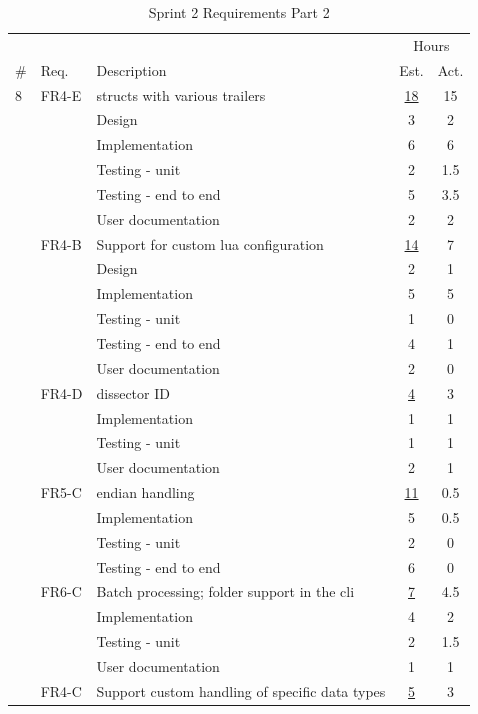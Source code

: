 \begin{table}[!htb] \small \center
\caption{Sprint 2 Requirements Part 2\label{tab:sprint2req2}}
\begin{tabularx}{\textwidth}{l l X c c}
	\toprule
	& & & \multicolumn{2}{c}{Hours} \\
	\cmidrule(r){4-5}
	\# & Req. & Description & Est. & Act. \\
	\midrule
	8 & FR4-E & \Glspl{struct} with various \gls{trailers} & \underline{ 18 } & 15 \\
	   &  & Design & 3 & 2 \\
	   &  & Implementation & 6 & 6 \\
	   &  & Testing - unit & 2 & 1.5 \\
	   &  & Testing - end to end & 5 & 3.5 \\
	   &  & User documentation & 2 & 2 \\
	\addlinespace
	9 & FR4-B & Support for custom \Gls{lua} configuration & \underline{ 14 } & 7 \\
	   &  & Design & 2 & 1 \\
	   &  & Implementation & 5 & 5 \\
	   &  & Testing - unit & 1 & 0 \\
	   &  & Testing - end to end & 4 & 1 \\
	   &  & User documentation & 2 & 0 \\
	\addlinespace
	10 & FR4-D & \Gls{dissector} ID & \underline{ 4 } & 3 \\
	   &  & Implementation & 1 & 1 \\
	   &  & Testing - unit & 1 & 1 \\
	   &  & User documentation & 2 & 1 \\
	\addlinespace
	11 & FR5-C & \Gls{endian} handling & \underline{ 11 } & 0.5 \\
	   &  & Implementation & 5 & 0.5 \\
	   &  & Testing - unit & 2 & 0 \\
	   &  & Testing - end to end & 6 & 0 \\
	\addlinespace
	12 & FR6-C & Batch processing; folder support in the \gls{cli} & \underline{ 7 } & 4.5 \\
	   &  & Implementation & 4 & 2 \\
	   &  & Testing - unit & 2 & 1.5 \\
	   &  & User documentation & 1 & 1 \\
	\addlinespace
	13 & FR4-C & Support custom handling of specific data types & \underline{ 5 } & 3 \\

\end{tabularx}
\end{table}
